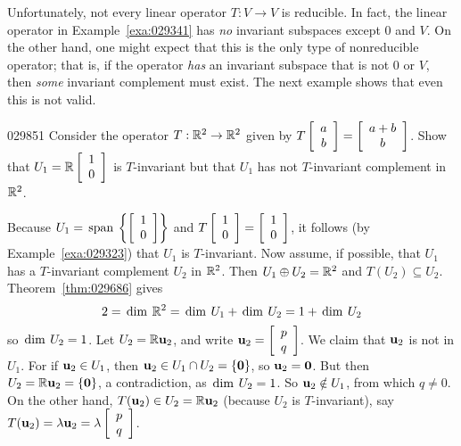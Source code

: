 Unfortunately, not every linear operator $T : V \to V$ is reducible. In fact, the linear operator in Example~\ref{exa:029341} has \textit{no} invariant subspaces except $0$ and $V$. On the other hand, one might expect that this is the only type of nonreducible operator; that is, if the operator \textit{has} an invariant subspace that is not $0$ or $V$, then \textit{some} invariant complement must exist. The next example shows that even this is not valid.


\begin{example}{}{029851}
Consider the operator $T : \mathbb{R}^2 \to \mathbb{R}^2$ given by $T\left[ \begin{array}{c} a \\ b \end{array} \right] = \left[ \begin{array}{c} a + b \\ b \end{array} \right]$. Show that $U_1 = \mathbb{R}\left[ \begin{array}{c} 1 \\ 0 \end{array} \right]$ is $T$-invariant but that $U_1$ has not $T$-invariant complement in $\mathbb{R}^2$.

\begin{solution}
Because $U_1 = \thinspace\operatorname{span \medspace}\left\{\left[ \begin{array}{c} 1 \\ 0 \end{array} \right] \right\}$ and $T\left[ \begin{array}{c} 1 \\ 0 \end{array} \right] = \left[ \begin{array}{c} 1 \\ 0 \end{array} \right]$, it follows (by Example~\ref{exa:029323}) that $U_{1}$ is $T$-invariant. Now assume, if possible, that $U_{1}$ has a $T$-invariant complement $U_{2}$ in $\mathbb{R}^2$. Then $U_{1} \oplus U_{2} = \mathbb{R}^2$ and $T(U_{2}) \subseteq U_{2}$. Theorem~\ref{thm:029686} gives
\begin{equation*}
2 = \thinspace\operatorname{dim \medspace} \mathbb{R}^2 = \thinspace\operatorname{dim \medspace} U_1 + \thinspace\operatorname{dim \medspace} U_2 = 1 + \thinspace\operatorname{dim \medspace} U_2
\end{equation*}
so $\thinspace\operatorname{dim \medspace}U_{2} = 1$. Let $U_{2} = \mathbb{R}\textbf{u}_{2}$, and write $\textbf{u}_2 = \left[ \begin{array}{c} p \\ q \end{array} \right]$. We claim that $\textbf{u}_{2}$ is not in $U_{1}$. For if $\textbf{u}_{2} \in U_{1}$, then $\textbf{u}_{2} \in U_{1} \cap U_{2} = \{\textbf{0}\}$, so $\textbf{u}_{2} = \textbf{0}$. But then $U_{2} = \mathbb{R}\textbf{u}_{2} = \{\textbf{0}\}$, a contradiction, as $\thinspace\operatorname{dim \medspace}U_{2} = 1$. So $\textbf{u}_{2} \notin U_{1}$, from which $q \neq 0$. On the other hand, $T(\textbf{u}_{2}) \in U_{2} = \mathbb{R}\textbf{u}_{2}$ (because $U_{2}$ is $T$-invariant), say $T(\textbf{u}_2) = \lambda\textbf{u}_2 = \lambda\left[ \begin{array}{c} p \\ q \end{array} \right]$.


\end{solution}
\end{example}
